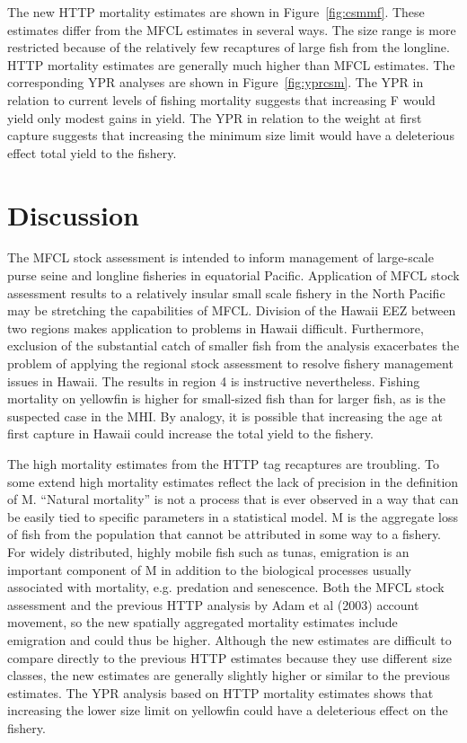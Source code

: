 \documentclass[12pt,letterpaper]{article}
\newcommand\help[1]{\color{Magenta}{\it #1 }\normalcolor}
\begin{document}
The new HTTP mortality estimates are shown in Figure~\ref{fig:csmmf}.
These estimates differ from the MFCL estimates in several ways. The
size range is more restricted because of the relatively few
recaptures of large fish from the longline. HTTP mortality estimates
are generally much higher than MFCL estimates.
The corresponding YPR analyses are shown in Figure~\ref{fig:yprcsm}.
The YPR in relation to current levels of fishing mortality suggests
that increasing F would yield only modest gains in yield.
The YPR in relation to the weight at first capture suggests that
increasing the minimum size limit would have a deleterious effect
total yield to the fishery.


\section*{Discussion}
The MFCL stock assessment is intended to inform management of
large-scale purse seine and longline fisheries in equatorial Pacific.
Application of MFCL stock assessment results to a relatively insular
small scale fishery in the North Pacific may be stretching the
capabilities of MFCL. Division of the Hawaii EEZ between two regions
makes application to problems in Hawaii difficult. Furthermore,
exclusion of the substantial catch of smaller fish from the analysis exacerbates
the problem of applying the regional stock assessment to
resolve fishery management issues in Hawaii. The results in region 4
is instructive nevertheless.
Fishing mortality on yellowfin is higher for small-sized fish than for
larger fish, as is the suspected case in the MHI. By analogy, it is
possible that increasing the age at first capture in Hawaii could increase
the total yield to the fishery. 

The high mortality estimates from the HTTP tag recaptures are
troubling. To some extend high mortality estimates reflect the
lack of precision in the definition of M. ``Natural mortality'' is not
a process that is ever observed in a way that can be easily tied to
specific parameters in a statistical model. M is the aggregate loss of fish from
the population  that cannot be attributed in some way to a
fishery. For widely distributed, highly mobile fish such as tunas,
emigration is an important component of M in addition to the
biological processes usually associated with mortality, e.g. predation and
senescence. Both the MFCL stock assessment and the previous HTTP
analysis by Adam et al (2003) account movement, so the new
spatially aggregated mortality estimates include emigration and could
thus be higher.
Although the new estimates are difficult to compare directly to the
previous HTTP estimates because they use different size
classes, the new estimates are generally slightly higher or similar to
the previous estimates. \help{It should be possible to do a better
comparison between old and new HTTP estimates.}
The YPR analysis based on HTTP mortality estimates shows that
increasing the lower size limit on yellowfin could have a deleterious
effect on the fishery.
\end{document}
